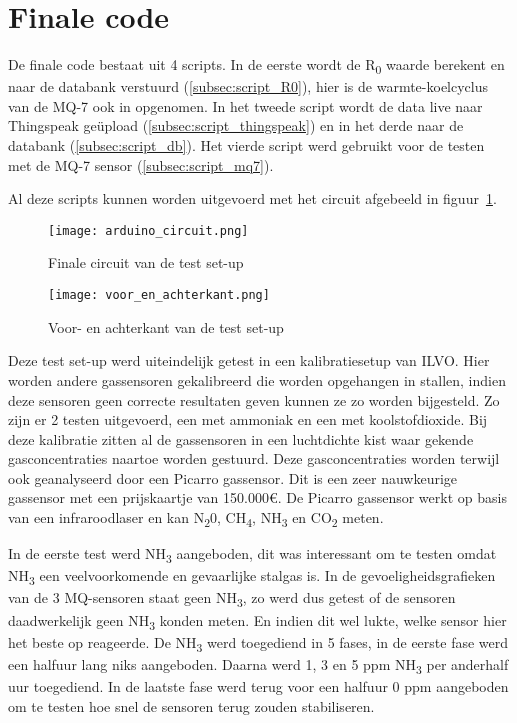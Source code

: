 \section{Finale code}%
\label{sec:final}

De finale code bestaat uit 4 scripts. In de eerste wordt de R\textsubscript{0} waarde berekent en naar de databank verstuurd (\ref{subsec:script_R0}), hier is de warmte-koelcyclus van de MQ-7 ook in opgenomen. In het tweede script wordt de data live naar Thingspeak geüpload (\ref{subsec:script_thingspeak}) en in het derde naar de databank (\ref{subsec:script_db}). Het vierde script werd gebruikt voor de testen met de MQ-7 sensor (\ref{subsec:script_mq7}).

Al deze scripts kunnen worden uitgevoerd met het circuit afgebeeld in figuur~\ref{fig:arduino_circuit}.

\begin{figure}[h]
    \texttt{[image: arduino\_circuit.png]}
    \caption[Circuit test set-up]{Finale circuit van de test set-up}
    \label{fig:arduino_circuit}
\end{figure}

\begin{figure}[h]
    \texttt{[image: voor\_en\_achterkant.png]}
    \caption[Foto test set-up]{Voor- en achterkant van de test set-up}
    \label{fig:voor_en_achterkant}
\end{figure}


Deze test set-up werd uiteindelijk getest in een kalibratiesetup van ILVO. Hier worden andere gassensoren gekalibreerd die worden opgehangen in stallen, indien deze sensoren geen correcte resultaten geven kunnen ze zo worden bijgesteld. Zo zijn er 2 testen uitgevoerd, een met ammoniak en een met koolstofdioxide. Bij deze kalibratie zitten al de gassensoren in een luchtdichte kist waar gekende gasconcentraties naartoe worden gestuurd. Deze gasconcentraties worden terwijl ook geanalyseerd door een Picarro gassensor. Dit is een zeer nauwkeurige gassensor met een prijskaartje van 150.000€. De Picarro gassensor werkt op basis van een infraroodlaser en kan N\textsubscript{2}0, CH\textsubscript{4}, NH\textsubscript{3} en CO\textsubscript{2} meten.

In de eerste test werd NH\textsubscript{3} aangeboden, dit was interessant om te testen omdat NH\textsubscript{3} een veelvoorkomende en gevaarlijke stalgas is. In de gevoeligheidsgrafieken van de 3 MQ-sensoren staat geen NH\textsubscript{3}, zo werd dus getest of de sensoren daadwerkelijk geen NH\textsubscript{3} konden meten. En indien dit wel lukte, welke sensor hier het beste op reageerde. De NH\textsubscript{3} werd toegediend in 5 fases, in de eerste fase werd een halfuur lang niks aangeboden. Daarna werd 1, 3 en 5 ppm NH\textsubscript{3} per anderhalf uur toegediend. In de laatste fase werd terug voor een halfuur 0 ppm aangeboden om te testen hoe snel de sensoren terug zouden stabiliseren.

